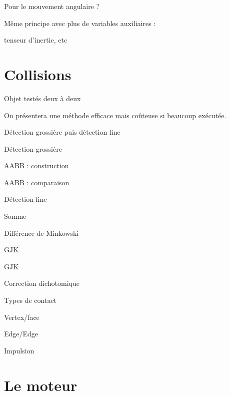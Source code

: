 \documentclass{beamer}
\begin{document}
\begin{frame}
  Pour le mouvement angulaire ?

  Même principe avec plus de variables auxiliaires :

  tenseur d'inertie, etc
\end{frame}

\section{Collisions}

\begin{frame}
  Objet testés deux à deux

  On présentera une méthode efficace mais coûteuse si beaucoup exécutée.

  Détection grossière puis détection fine
\end{frame}

\begin{frame}
  Détection grossière

  AABB : construction

  AABB : comparaison
\end{frame}

\begin{frame}
  Détection fine

  Somme
\end{frame}

\begin{frame}
  Différence de Minkowski
\end{frame}

\begin{frame}
  GJK
\end{frame}

\begin{frame}
  GJK
\end{frame}

\begin{frame}
  Correction dichotomique
\end{frame}

\begin{frame}
  Types de contact

  Vertex/face

  Edge/Edge
\end{frame}

\begin{frame}
  Impulsion
\end{frame}

\section{Le moteur}
\end{document}
